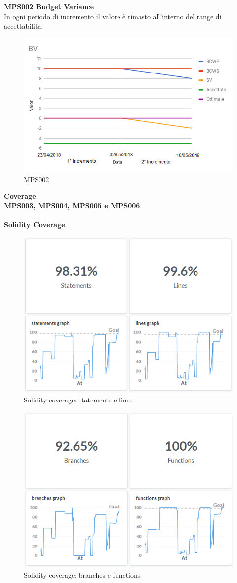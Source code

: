 \documentclass[PianoDiQualifica.tex]{subfiles}
\begin{document}
\textbf{MPS002 Budget Variance}\\
In ogni periodo di incremento il valore è rimasto all'interno del range di accettabilità.
\begin{figure}[H]
	\centering
	\includegraphics[width=0.8\linewidth]{RA/BV}
	\caption{MPS002}
	\label{fig:processi}
\end{figure}
\newpage
\textbf{Coverage}
\\
\textbf{MPS003, MPS004, MPS005 e MPS006}
\\\\
\textbf{Solidity Coverage}
\begin{figure}[H]
	\centering
	\includegraphics[width=0.6\linewidth]{RQ/SolidityCoverage1}
	\caption{Solidity coverage: statements e lines}
	\label{fig:processi}
\end{figure}
\begin{figure}[H]
	\centering
	\includegraphics[width=0.6\linewidth]{RQ/SolidityCoverage2}
	\caption{Solidity coverage: branches e functions}
	\label{fig:processi}
\end{figure}
\end{document}
